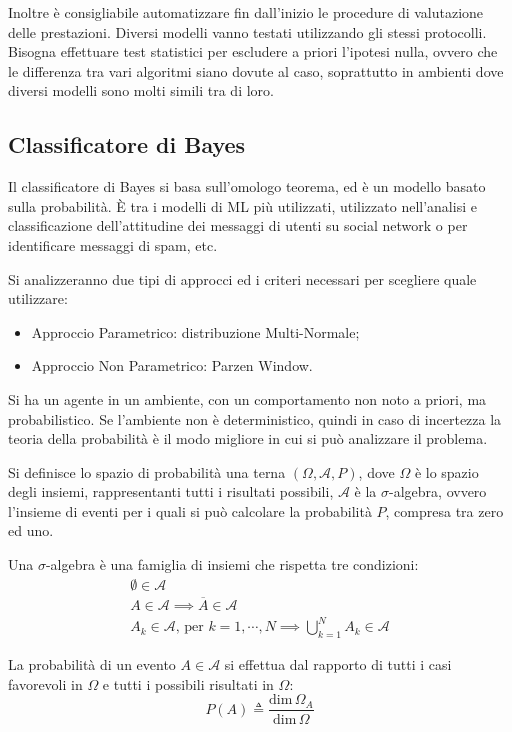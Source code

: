 \documentclass{article}
\numberwithin{equation}{subsection}
\begin{document}
Inoltre è consigliabile automatizzare fin dall'inizio le procedure di valutazione delle prestazioni. Diversi modelli vanno testati utilizzando gli stessi protocolli. Bisogna effettuare test statistici per escludere a priori l'ipotesi nulla, ovvero che le differenza tra vari algoritmi siano dovute al caso, soprattutto in ambienti dove diversi modelli sono molti simili tra di loro. 

\subsection{Classificatore di Bayes}

Il classificatore di Bayes si basa sull'omologo teorema, ed è un modello basato sulla probabilità. \`{E} tra i modelli di ML più utilizzati, utilizzato nell'analisi e 
classificazione dell'attitudine dei messaggi di utenti su social network o per identificare messaggi di spam, etc. 

Si analizzeranno due tipi di approcci ed i criteri necessari per scegliere quale utilizzare:
\begin{itemize}
    \item Approccio Parametrico: distribuzione Multi-Normale;
    \item Approccio Non Parametrico: Parzen Window. 
\end{itemize}

Si ha un agente in un ambiente, con un comportamento non noto a priori, ma probabilistico. Se l'ambiente non è deterministico, quindi in caso di incertezza la teoria della probabilità è il modo migliore in cui si può analizzare il problema. 

Si definisce lo spazio di probabilità una terna $(\Omega, \mathscr{A},P)$, dove $\Omega$ è lo spazio degli insiemi, rappresentanti tutti i risultati possibili, $\mathscr{A}$ è la $\sigma$-algebra, ovvero l'insieme di eventi per i quali si può calcolare la probabilità $P$, compresa tra zero ed uno. 

Una $\sigma$-algebra è una famiglia di insiemi che rispetta tre condizioni:
\begin{gather*}
    \emptyset\in\mathscr{A}\\
    A\in\mathscr{A}\implies\overline{A}\in\mathscr{A}\\
    A_k\in\mathscr{A},\,\text{per }k=1,\cdots,N\implies\bigcup_{k=1}^NA_k\in\mathscr{A}
\end{gather*}

La probabilità di un evento $A\in\mathscr{A}$ si effettua dal rapporto di tutti i casi favorevoli in $\Omega$ e tutti i possibili risultati in $\Omega$:
\begin{equation*}
    P(A)\triangleq\displaystyle\frac{\text{dim}\,\Omega_A}{\text{dim}\,\Omega}
\end{equation*}
\end{document}
